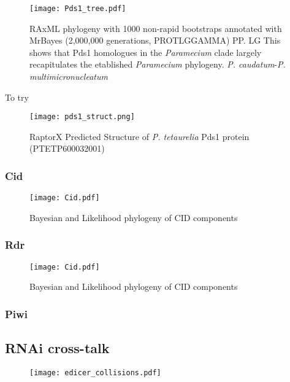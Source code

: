 \begin{figure}
    \texttt{[image: Pds1\_tree.pdf]}
    \caption[Phylogeny of Pds1 Sequences]{RAxML phylogeny with 1000 non-rapid
        bootstraps annotated with MrBayes (2,000,000 generations, PROTLGGAMMA) PP. LG This shows that Pds1 homologues
in the \textit{Paramecium} clade largely recapitulates the etablished
\textit{Paramecium} phylogeny.  \textit{P. caudatum}-\textit{P. multimicronucleatum}}
\label{fig:psd1}
\end{figure}


To try 

\begin{figure}
    \texttt{[image: pds1\_struct.png]}
    \caption[Predicted Structure of Pds1]{RaptorX Predicted Structure of \textit{P. tetaurelia}
    Pds1 protein (PTETP600032001) }
    \label{}
\end{figure}


\subsubsection{Cid}

\begin{figure}
    \texttt{[image: Cid.pdf]}
    \caption[Phylogeny of Cid Sequences]{Bayesian
    and Likelihood phylogeny of CID components}
    \label{fig:cid_phlyo}
\end{figure}


\subsubsection{Rdr}


\begin{figure}
    \texttt{[image: Cid.pdf]}
    \caption[Phylogeny of Cid Sequences]{Bayesian
    and Likelihood phylogeny of CID components}
    \label{fig:cid_phlyo}
\end{figure}

\subsubsection{Piwi}



\subsection{RNAi cross-talk}

\begin{figure}
    \centering
    \texttt{[image: edicer\_collisions.pdf]}
    \caption[]{}
    \label{fig:edicer_collisions}
\end{figure}


